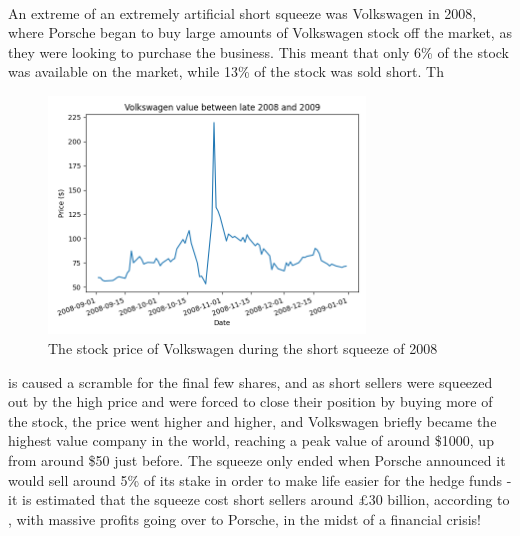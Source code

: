 \documentclass[11pt]{article} %
\begin{document}
\paragraph{}
An extreme of an extremely artificial short squeeze was Volkswagen in 2008, where 
Porsche began to buy large amounts of Volkswagen stock off the market, as they were looking 
to purchase the business. This 
meant that only 6\% of the stock was available on the market, while 13\% of the stock 
was sold short. Th\begin{figure}[h]
    \centering
    \includegraphics[width=0.75\textwidth]{volkswagenShortSqueeze.png}
    \caption{The stock price of Volkswagen during the short squeeze of 2008}
    \end{figure}is caused a scramble for the final few shares, and as short sellers 
were squeezed out by the high price and were forced to close their position by buying 
more of the stock, the price went higher and higher, and Volkswagen briefly became 
the highest value company in the world, reaching a peak value of around \$1000, up from 
around \$50 just before. The squeeze only ended when Porsche announced 
it would sell around 5\% of its stake in order to make life easier for the hedge 
funds - it is estimated that the squeeze cost short sellers around £30 billion, 
according to \cite{volkswagen}, with massive profits going over to Porsche, in the midst 
of a financial crisis!
\end{document}
